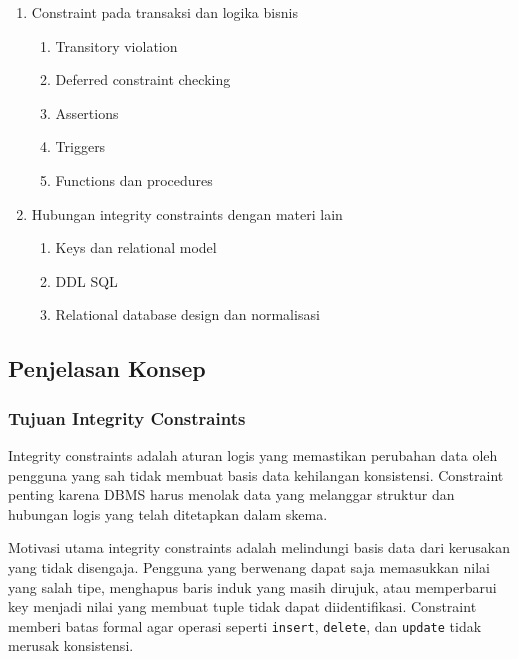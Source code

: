 \begin{enumerate}
\begin{enumerate}
    \end{enumerate}
    \item \ppaham Constraint pada transaksi dan logika bisnis
    \begin{enumerate}
        \item \ppaham Transitory violation
        \item \ppaham Deferred constraint checking
        \item \ppaham Assertions
        \item \ppaham Triggers
        \item \ppaham Functions dan procedures
    \end{enumerate}
    \item \pwajib Hubungan integrity constraints dengan materi lain
    \begin{enumerate}
        \item \pwajib Keys dan relational model
        \item \pwajib DDL SQL
        \item \pwajib Relational database design dan normalisasi
    \end{enumerate}
\end{enumerate}

\subsection{Penjelasan Konsep}

\subsubsection{Tujuan Integrity Constraints}

\begin{jawab}
Integrity constraints adalah aturan logis yang memastikan perubahan data oleh pengguna yang sah tidak membuat basis data kehilangan konsistensi. Constraint penting karena DBMS harus menolak data yang melanggar struktur dan hubungan logis yang telah ditetapkan dalam skema.
\end{jawab}

Motivasi utama integrity constraints adalah melindungi basis data dari kerusakan yang tidak disengaja. Pengguna yang berwenang dapat saja memasukkan nilai yang salah tipe, menghapus baris induk yang masih dirujuk, atau memperbarui key menjadi nilai yang membuat tuple tidak dapat diidentifikasi. Constraint memberi batas formal agar operasi seperti \texttt{insert}, \texttt{delete}, dan \texttt{update} tidak merusak konsistensi.

